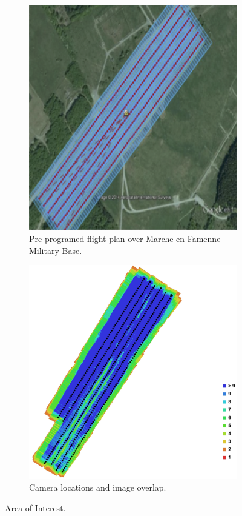 \documentclass{article}
\begin{document}
\begin{figure}[h]
 \begin{subfigure} [b]{0.49\textwidth}
         \centering
         \includegraphics[scale=0.6]{ROB-15-0035_fig22a.png}
         \caption{Pre-programed flight plan over Marche-en-Famenne Military Base.}
         \label{fig:ppFpo}
 \end{subfigure}
 \begin{subfigure} [b]{0.49\textwidth}
         \centering
         \includegraphics[scale=0.14]{ROB-15-0035_fig22b.jpg}
         \caption{Camera locations and image overlap.}
         \label{fig:claio}
 \end{subfigure}
 \caption{Area of Interest.}
\label{fig:hrun}
\end{figure}
\end{document}
